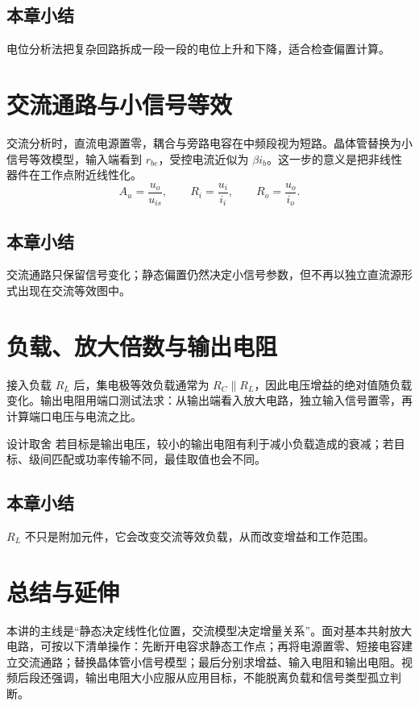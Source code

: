\documentclass[a4paper]{article}
\begin{document}
\subsection{本章小结}
电位分析法把复杂回路拆成一段一段的电位上升和下降，适合检查偏置计算。

\section{交流通路与小信号等效}
交流分析时，直流电源置零，耦合与旁路电容在中频段视为短路。晶体管替换为小信号等效模型，输入端看到 $r_{be}$，受控电流近似为 $\beta i_b$。这一步的意义是把非线性器件在工作点附近线性化。
\[
A_u=\frac{u_o}{u_{is}},\qquad R_i=\frac{u_i}{i_i},\qquad R_o=\frac{u_o}{i_o}.
\]
\subsection{本章小结}
交流通路只保留信号变化；静态偏置仍然决定小信号参数，但不再以独立直流源形式出现在交流等效图中。

\section{负载、放大倍数与输出电阻}
接入负载 $R_L$ 后，集电极等效负载通常为 $R_C\parallel R_L$，因此电压增益的绝对值随负载变化。输出电阻用端口测试法求：从输出端看入放大电路，独立输入信号置零，再计算端口电压与电流之比。
\begin{importantbox}{设计取舍}
若目标是输出电压，较小的输出电阻有利于减小负载造成的衰减；若目标、级间匹配或功率传输不同，最佳取值也会不同。
\end{importantbox}
\subsection{本章小结}
$R_L$ 不只是附加元件，它会改变交流等效负载，从而改变增益和工作范围。

\section{总结与延伸}
本讲的主线是“静态决定线性化位置，交流模型决定增量关系”。面对基本共射放大电路，可按以下清单操作：先断开电容求静态工作点；再将电源置零、短接电容建立交流通路；替换晶体管小信号模型；最后分别求增益、输入电阻和输出电阻。视频后段还强调，输出电阻大小应服从应用目标，不能脱离负载和信号类型孤立判断。
\end{document}
